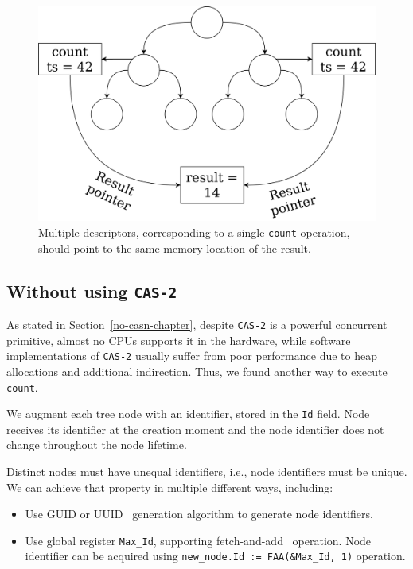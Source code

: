 \documentclass[times, dvipsnames,%
               languages={russian,english} %
              ]{itmo-student-thesis}
\begin{document}
\begin{figure}[H]
  \centering
  \caption{Multiple descriptors, corresponding to a single \texttt{count} operation,  should point to the same memory location of the result.}
  \label{count-copies-result-pic}
  \includegraphics[width=\linewidth]{pics/count-copies-result.png}
\end{figure}

\subsection{Without using \texttt{CAS-2}}
\label{count-no-cas2-section}

As stated in Section~\ref{no-casn-chapter}, despite \texttt{CAS-2} is a powerful concurrent primitive, almost no CPUs supports it in the hardware, while software implementations of \texttt{CAS-2} usually suffer from poor performance due to heap allocations and additional indirection. Thus, we found another way to execute \texttt{count}.

We augment each tree node with an identifier, stored in the \texttt{Id} field. Node receives its identifier at the creation moment and the node identifier does not change throughout the node lifetime. 

Distinct nodes must have unequal identifiers, i.e., node identifiers must be unique. We can achieve that property in multiple different ways, including:

\begin{itemize}
    \item Use GUID or UUID~\cite{uuid-wiki} generation algorithm to generate node identifiers.
    
    \item Use global register \texttt{Max\_Id}, supporting fetch-and-add~\cite{fetch-and-add} operation. Node identifier can be acquired using \texttt{new\_node.Id := FAA(\&Max\_Id, 1)} operation.
\end{itemize}
\end{document}
